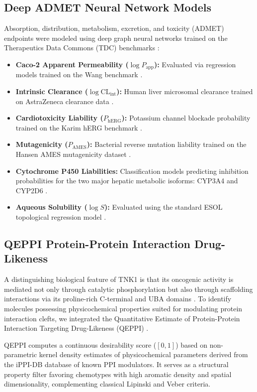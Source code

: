 \documentclass[journal]{IEEEtran}
\begin{document}
\subsection{Deep ADMET Neural Network Models}
Absorption, distribution, metabolism, excretion, and toxicity (ADMET) endpoints were modeled using deep graph neural networks trained on the Therapeutics Data Commons (TDC) benchmarks \cite{huang2021therapeutics}:
\begin{itemize}
    \item \textbf{Caco-2 Apparent Permeability ($\log P_{\text{app}}$):} Evaluated via regression models trained on the Wang benchmark \cite{caco2_wang}.
    \item \textbf{Intrinsic Clearance ($\log \text{CL}_{\text{int}}$):} Human liver microsomal clearance trained on AstraZeneca clearance data \cite{clearance_az}.
    \item \textbf{Cardiotoxicity Liability ($P_{\text{hERG}}$):} Potassium channel blockade probability trained on the Karim hERG benchmark \cite{herg_karim}.
    \item \textbf{Mutagenicity ($P_{\text{AMES}}$):} Bacterial reverse mutation liability trained on the Hansen AMES mutagenicity dataset \cite{ames_hansen}.
    \item \textbf{Cytochrome P450 Liabilities:} Classification models predicting inhibition probabilities for the two major hepatic metabolic isoforms: CYP3A4 and CYP2D6 \cite{veith2009cyp}.
    \item \textbf{Aqueous Solubility ($\log S$):} Evaluated using the standard ESOL topological regression model \cite{delaney2004esol}.
\end{itemize}

\subsection{QEPPI Protein-Protein Interaction Drug-Likeness}
A distinguishing biological feature of TNK1 is that its oncogenic activity is mediated not only through catalytic phosphorylation but also through scaffolding interactions via its proline-rich C-terminal and UBA domains \cite{chan2021tnk1}. To identify molecules possessing physicochemical properties suited for modulating protein interaction clefts, we integrated the Quantitative Estimate of Protein-Protein Interaction Targeting Drug-Likeness (QEPPI) \cite{qeppi2021}. 

QEPPI computes a continuous desirability score ($[0, 1]$) based on non-parametric kernel density estimates of physicochemical parameters derived from the iPPI-DB database of known PPI modulators. It serves as a structural property filter favoring chemotypes with high aromatic density and spatial dimensionality, complementing classical Lipinski and Veber criteria.
\end{document}
